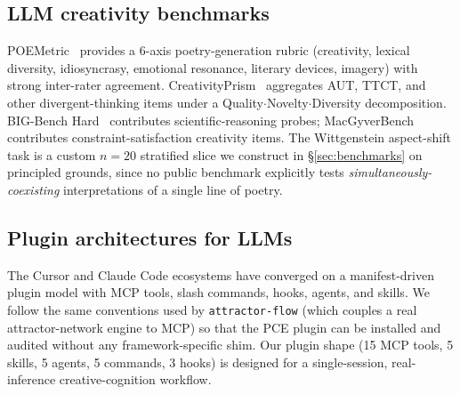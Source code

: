 \subsection{LLM creativity benchmarks}

POEMetric~\citep{Ye2025POEMetric} provides a 6-axis poetry-generation rubric (creativity, lexical diversity, idiosyncrasy, emotional resonance, literary devices, imagery) with strong inter-rater agreement. CreativityPrism~\citep{CreativityPrism2025} aggregates AUT, TTCT, and other divergent-thinking items under a Quality$\cdot$Novelty$\cdot$Diversity decomposition. BIG-Bench Hard~\citep{Suzgun2022BBH} contributes scientific-reasoning probes; MacGyverBench~\citep{Tian2024MacGyverBench} contributes constraint-satisfaction creativity items. The Wittgenstein aspect-shift task is a custom $n=20$ stratified slice we construct in \S\ref{sec:benchmarks} on principled grounds, since no public benchmark explicitly tests \emph{simultaneously-coexisting} interpretations of a single line of poetry.

\subsection{Plugin architectures for LLMs}

The Cursor and Claude Code ecosystems have converged on a manifest-driven plugin model with MCP tools, slash commands, hooks, agents, and skills. We follow the same conventions used by \texttt{attractor-flow} \citep{AttractorFlow2025} (which couples a real attractor-network engine to MCP) so that the PCE plugin can be installed and audited without any framework-specific shim. Our plugin shape (15 MCP tools, 5 skills, 5 agents, 5 commands, 3 hooks) is designed for a single-session, real-inference creative-cognition workflow.

